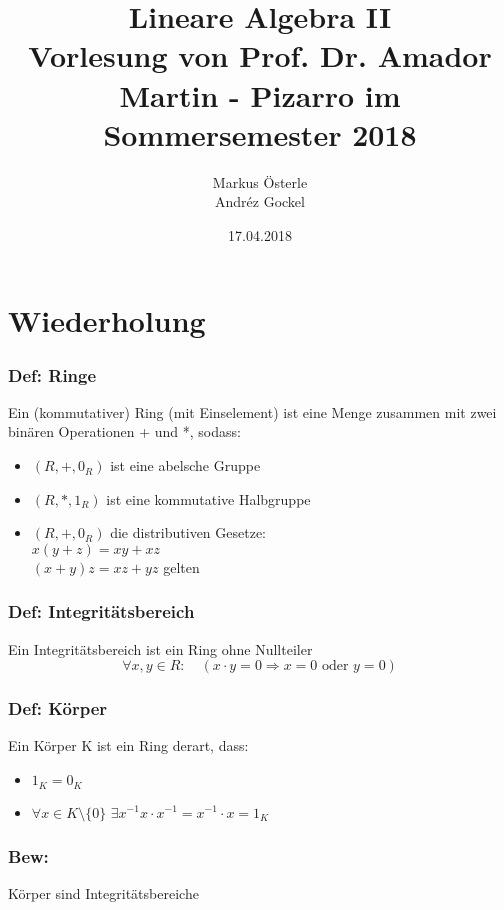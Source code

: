 \documentclass[titlepage,12pt,a4paper,ngerman]{report}
\begin{document}
	
\renewcommand{\thechapter}{\Roman{chapter}}

\title{
	\Huge Lineare Algebra II \\[1em]
	\Large Vorlesung von Prof. Dr. Amador Martin - Pizarro im Sommersemester 2018}
\author{Markus Österle\\ Andréz Gockel}
\date{17.04.2018}
\maketitle
\tableofcontents

\chapter{Wiederholung}
\subsection{Def: Ringe} Ein (kommutativer) Ring (mit Einselement) ist eine Menge zusammen mit zwei binären Operationen + und *, sodass:
\begin{itemize}
	\item $(R,+,0_{R})$ ist eine abelsche Gruppe
	\item $(R,*,1_{R})$  ist eine kommutative Halbgruppe
	\item $(R,+,0_{R})$ die distributiven Gesetze:\\
	$x(y+z) = xy+xz $\\
	$(x+y)z=xz+yz $
	gelten
\end{itemize}

\subsection{Def: Integritätsbereich} Ein Integritätsbereich ist ein Ring ohne Nullteiler $$\forall x,y \in R: \quad (x\cdot y = 0 \Rightarrow x=0\textrm{ oder } y=0)$$ 
\subsection{Def: Körper} Ein Körper K ist ein Ring derart, dass:
\begin{itemize}
	\item $1_{K} = 0_{K}$
	\item $\forall x \in K \setminus \{0\}$ $\exists x^{-1} x\cdot x^{-1} = x^{-1} \cdot x = 1_{K}$
\end{itemize}
\subsection{Bew:} Körper sind Integritätsbereiche
\end{document}
